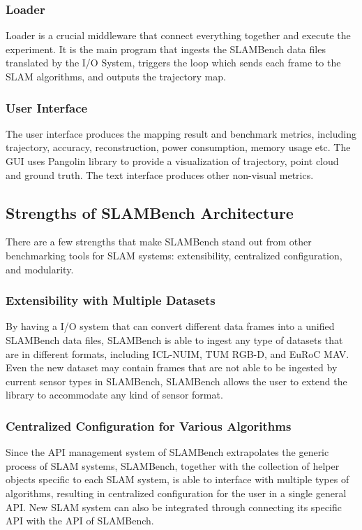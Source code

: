 \subsubsection*{Loader}
Loader is a crucial middleware that connect everything together and execute the experiment. 
It is the main program that ingests the SLAMBench data files translated by the I/O System, triggers the loop which sends each frame to the SLAM algorithms, and outputs the trajectory map. 

\subsubsection*{User Interface}
The user interface produces the mapping result and benchmark metrics, including trajectory, accuracy, reconstruction, power consumption, memory usage etc. 
The GUI uses Pangolin library to provide a visualization of trajectory, point cloud and ground truth. The text interface produces other non-visual metrics.

\subsection{Strengths of SLAMBench Architecture}
There are a few strengths that make SLAMBench stand out from other benchmarking tools for SLAM systems: extensibility, centralized configuration, and modularity. 

\subsubsection*{Extensibility with Multiple Datasets}
By having a I/O system that can convert different data frames into a unified SLAMBench data files, SLAMBench is able to ingest any type of datasets that are in different formats, including ICL-NUIM, TUM RGB-D, and EuRoC MAV. 
Even the new dataset may contain frames that are not able to be ingested by current sensor types in SLAMBench, SLAMBench allows the user to extend the library to accommodate any kind of sensor format. 

\subsubsection*{Centralized Configuration for Various Algorithms}
Since the API management system of SLAMBench extrapolates the generic process of SLAM systems, SLAMBench, together with the collection of helper objects specific to each SLAM system, is able to interface with multiple types of algorithms, resulting in centralized configuration for the user in a single general API. 
New SLAM system can also be integrated through connecting its specific API with the API of SLAMBench. 

